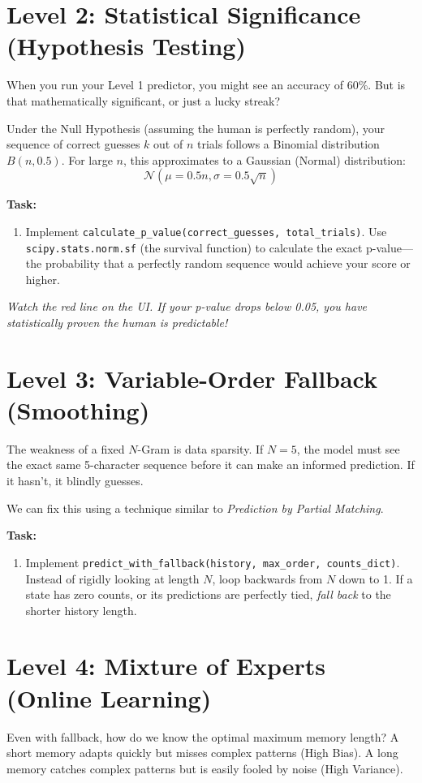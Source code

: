 \documentclass[12pt]{article}
\begin{document}
\section{Level 2: Statistical Significance (Hypothesis Testing)}
When you run your Level 1 predictor, you might see an accuracy of 60\%. But is that mathematically significant, or just a lucky streak?

Under the Null Hypothesis (assuming the human is perfectly random), your sequence of correct guesses $k$ out of $n$ trials follows a Binomial distribution $B(n, 0.5)$. For large $n$, this approximates to a Gaussian (Normal) distribution:
$$ \mathcal{N}\left(\mu = 0.5n, \sigma = 0.5\sqrt{n}\right) $$

\textbf{Task:}
\begin{enumerate}
    \item Implement \texttt{calculate\_p\_value(correct\_guesses, total\_trials)}. Use \texttt{scipy.stats.norm.sf} (the survival function) to calculate the exact p-value---the probability that a perfectly random sequence would achieve your score or higher.
\end{enumerate}
\textit{Watch the red line on the UI. If your p-value drops below 0.05, you have statistically proven the human is predictable!}

\section{Level 3: Variable-Order Fallback (Smoothing)}
The weakness of a fixed $N$-Gram is data sparsity. If $N=5$, the model must see the exact same 5-character sequence before it can make an informed prediction. If it hasn't, it blindly guesses.

We can fix this using a technique similar to \textit{Prediction by Partial Matching}. 

\textbf{Task:}
\begin{enumerate}
    \item Implement \texttt{predict\_with\_fallback(history, max\_order, counts\_dict)}. Instead of rigidly looking at length $N$, loop backwards from $N$ down to 1. If a state has zero counts, or its predictions are perfectly tied, \textit{fall back} to the shorter history length.
\end{enumerate}

\section{Level 4: Mixture of Experts (Online Learning)}
Even with fallback, how do we know the optimal maximum memory length? A short memory adapts quickly but misses complex patterns (High Bias). A long memory catches complex patterns but is easily fooled by noise (High Variance).
\end{document}

